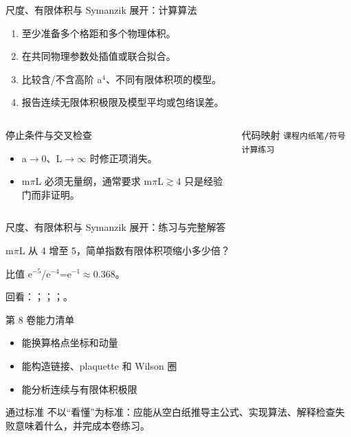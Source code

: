 \begin{frame}[t]{尺度、有限体积与 Symanzik 展开：计算算法}
\footnotesize
{}\begin{enumerate}
\item 至少准备多个格距和多个物理体积。
\item 在共同物理参数处插值或联合拟合。
\item 比较含/\allowbreak{}不含高阶 a\ensuremath{^{4}}、不同有限体积项的模型。
\item 报告连续无限体积极限及模型平均或包络误差。
\end{enumerate}\begin{columns}[T,onlytextwidth]
\begin{block}{停止条件与交叉检查}\scriptsize\begin{itemize}
\item[\CheckMark] a\ensuremath{\rightarrow}0、L\ensuremath{\rightarrow}\ensuremath{\infty} 时修正项消失。
\item[\CheckMark] m\ensuremath{\pi}L 必须无量纲，通常要求 m\ensuremath{\pi}L\ensuremath{\gtrsim}4 只是经验门而非证明。
\end{itemize}\end{block}
\begin{block}{代码映射}
\scriptsize \texttt{课程内纸笔/\allowbreak{}符号计算练习}
\end{block}\end{columns}\end{frame}

\begin{frame}[t]{尺度、有限体积与 Symanzik 展开：练习与完整解答}
\footnotesize
\begin{block}{}m\ensuremath{\pi}L 从 4 增至 5，简单指数有限体积项缩小多少倍？\end{block}
\begin{exampleblock}{}比值 e\ensuremath{^{-5}}/\allowbreak{}e\ensuremath{^{-4}}=e\ensuremath{^{-1}}\ensuremath{\approx}0.368。\end{exampleblock}
\vfill
\scriptsize 回看：；；；。
\end{frame}

\begin{frame}[t]{第 8 卷能力清单}
\small\begin{itemize}
\item[\CheckMark] 能换算格点坐标和动量
\item[\CheckMark] 能构造链接、plaquette 和 Wilson 圈
\item[\CheckMark] 能分析连续与有限体积极限
\end{itemize}\vfill\begin{block}{通过标准}
不以“看懂”为标准：应能从空白纸推导主公式、实现算法、解释检查失败意味着什么，并完成本卷练习。
\end{block}\end{frame}

